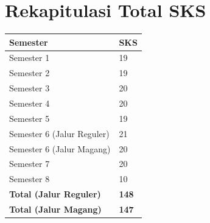 \section{Rekapitulasi Total SKS}

\begin{tabular}{L{5.5cm}C{2.5cm}}
\toprule
Semester & SKS \\
\midrule
Semester 1 & 19 \\
Semester 2 & 19 \\
Semester 3 & 20 \\
Semester 4 & 20 \\
Semester 5 & 19 \\
Semester 6 (Jalur Reguler) & 21 \\
Semester 6 (Jalur Magang) & 20 \\
Semester 7 & 20 \\
Semester 8 & 10 \\
\midrule
\textbf{Total (Jalur Reguler)} & \textbf{148} \\
\textbf{Total (Jalur Magang)} & \textbf{147} \\
\bottomrule
\end{tabular}

